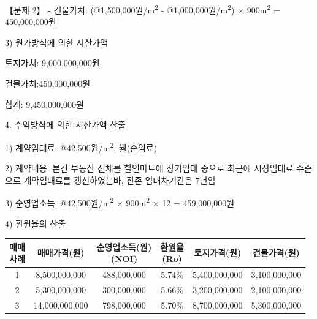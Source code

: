 \begin{longquestion}{【문제 2】}
\hspace*{1em}- 건물가치: (@1,500,000원/m\textsuperscript{2} - @1,000,000원/m\textsuperscript{2}) $\times$ 900m\textsuperscript{2} = 450,000,000원 \par
\hspace*{0.5em}3) 원가방식에 의한 시산가액 \par
\hspace*{1em}토지가치: 9,000,000,000원 \par
\hspace*{1em}건물가치:\hspace{0.8em}450,000,000원 \par
\hspace*{1em}합\hspace{1em}계: 9,450,000,000원 \par
4. 수익방식에 의한 시산가액 산출 \par
\hspace*{0.5em}1) 계약임대료: @42,500원/m\textsuperscript{2}, 월(순임료) \par
\hspace*{0.5em}2) 계약내용: 본건 부동산 전체를 할인마트에 장기임대 중으로 최근에 시장임대료 수준으로 계약임대료를 갱신하였는바, 잔존 임대차기간은 7년임 \par
\hspace*{0.5em}3) 순영업소득: @42,500원/m\textsuperscript{2} $\times$ 900m\textsuperscript{2} $\times$ 12 = 459,000,000원 \par
\hspace*{0.5em}4) 환원율의 산출 \par
{\small\centering
\begin{tabular}{|c|c|c|c|c|c|}
\hline
\makecell{매매\\사례} & 매매가격(원) & \makecell{순영업소득(원)\\(NOI)} & \makecell{환원율\\(Ro)} & 토지가격(원) & 건물가격(원) \\
\hline
1 & 8,500,000,000 & 488,000,000 & 5.74\% & 5,400,000,000 & 3,100,000,000 \\
\hline
2 & 5,300,000,000 & 300,000,000 & 5.66\% & 3,200,000,000 & 2,100,000,000 \\
\hline
3 & 14,000,000,000 & 798,000,000 & 5.70\% & 8,700,000,000 & 5,300,000,000 \\
\hline
\end{tabular}\par}


\end{longquestion}
